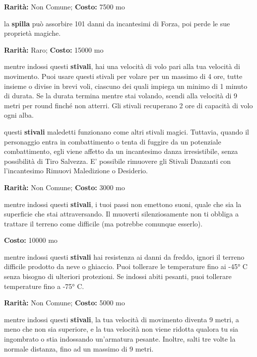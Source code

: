 \begin{multicols}{2}

\textbf{Rarità:} Non Comune; \textbf{Costo:} 7500 mo

la \textbf{spilla} può assorbire 101 danni da incantesimi di Forza, poi perde le sue proprietà magiche.


\textbf{Rarità:} Raro; \textbf{Costo:} 15000 mo

mentre indossi questi \textbf{stivali}, hai una velocità di volo pari alla tua velocità di movimento. Puoi usare questi stivali per volare per un massimo di 4 ore, tutte insieme o divise in brevi voli, ciascuno dei quali impiega un minimo di 1 minuto di durata. Se la durata termina mentre stai volando, scendi alla velocità di 9 metri per round finché non atterri. Gli stivali recuperano 2 ore di capacità di volo ogni alba.


questi \textbf{stivali} maledetti funzionano come altri stivali magici. Tuttavia, quando il personaggio entra in combattimento o tenta di fuggire da un potenziale combattimento, egli viene affetto da un incantesimo danza irresistibile, senza possibilità di Tiro Salvezza. E' possibile rimuovere gli Stivali Danzanti con l'incantesimo Rimuovi Maledizione o Desiderio.


\textbf{Rarità:} Non Comune; \textbf{Costo:} 3000 mo

mentre indossi questi \textbf{stivali}, i tuoi passi non emettono suoni, quale che sia la superficie che stai attraversando. Il muoverti silenziosamente non ti obbliga a trattare il terreno come difficile (ma potrebbe comunque esserlo).


\textbf{Costo:} 10000 mo

mentre indossi questi \textbf{stivali} hai resistenza ai danni da freddo, ignori il terreno difficile prodotto da neve o ghiaccio. Puoi tollerare le temperature fino ai -45° C senza bisogno di ulteriori protezioni. Se indossi abiti pesanti, puoi tollerare temperature fino a -75° C.


\textbf{Rarità:} Non Comune; \textbf{Costo:} 5000 mo

mentre indossi questi \textbf{stivali}, la tua velocità di movimento diventa 9 metri, a meno che non sia superiore, e la tua velocità non viene ridotta qualora tu sia ingombrato o stia indossando un'armatura pesante. Inoltre, salti tre volte la normale distanza, fino ad un massimo di 9 metri.


\end{multicols}
